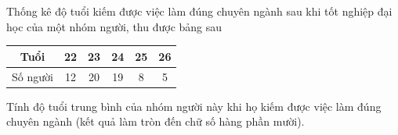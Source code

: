 \begin{ex}%
Thống kê độ tuổi kiếm được việc làm đúng chuyên ngành sau khi tốt nghiệp đại học của một nhóm người, thu được bảng sau
\begin{center}
\begin{tabular}{|c|c|c|c|c|c|}
\hline
Tuổi		& 22& 23& 24& 25& 26 \\
\hline
Số người 	& 12& 20& 19& 8& 5\\
\hline
\end{tabular}
\end{center}
Tính độ tuổi trung bình của nhóm người này khi họ kiếm được việc làm đúng chuyên ngành (kết quả làm tròn đến chữ số hàng phần mười).
\end{ex}

